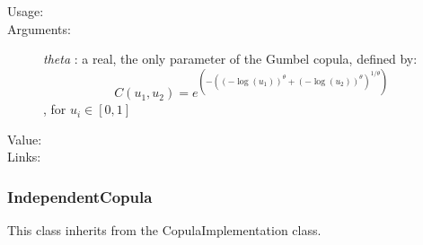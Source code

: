 \begin{description}

\item[Usage:] \rule{0pt}{1em}


\item[Arguments:]  \textit{theta}    : a real, the only parameter of the Gumbel copula, defined by:
\begin{equation}
C(u_1, u_2) = \displaystyle e^{\left(-\left((-\log(u_1))^{\theta}+(-\log(u_2))^{\theta}\right)^{1/\theta}\right)}
\end{equation}, for $u_i \in [0,1]$

\item[Value:]  \rule{0pt}{1em}

\item[Links:]
\end{description}

\newpage
\subsubsection{IndependentCopula}

This class inherits from the CopulaImplementation class.

